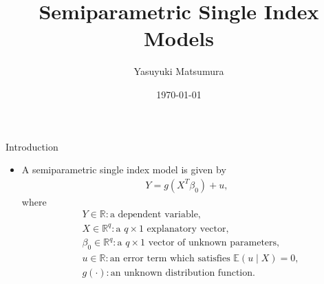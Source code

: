 \documentclass[xcolor=svgnames,dvipdfmx,cjk]{beamer}
\theoremstyle{example}
\begin{document}
 

\title[Li and Racine (2007, Chapter 8)]{Semiparametric Single Index Models} 
\author[Y. Matsumura]{Yasuyuki Matsumura}          
\date{\today}


\begin{frame}                  
\titlepage                     
\end{frame}




\begin{frame}{Introduction}
  \begin{itemize}
    \item  A semiparametric single index model is given by 
            \begin{align*}
              Y = g (X^{T} \beta_0) + u,
            \end{align*}
           where  
            \begin{align*}
              & Y \in \mathbb{R}: \text{a dependent variable}, \\
              & X \in \mathbb{R}^{q}: \text{a }  q \times 1 \text{ explanatory vector}, \\
              & \beta_0 \in \mathbb{R}^{q}: \text{a }  q \times 1 \text{ vector of unknown parameters}, \\
              & u \in \mathbb{R}: \text{an error term which satisfies } \mathbb{E}(u \mid X) =0, \\
              & g(\cdot): \text{an unknown distribution function}.
            \end{align*}
  \end{itemize}
\end{frame}
\end{document}
